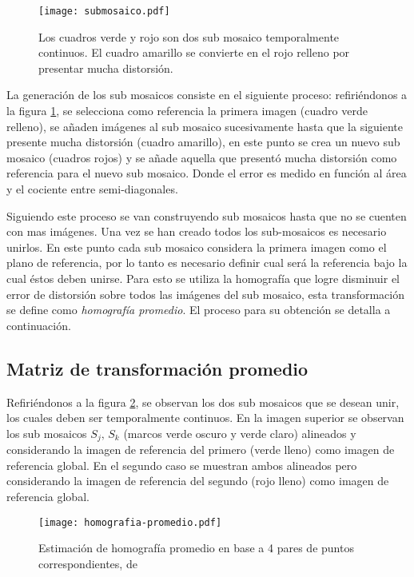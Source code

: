 \begin{figure}[h]
	\centering
	\texttt{[image: submosaico.pdf]}
	\caption[Generación de sub mosaicos]{Los cuadros verde y rojo son dos sub mosaico temporalmente continuos. El cuadro amarillo se convierte en el rojo relleno por presentar mucha distorsión.}
	\label{imagen:generacion-submosaico}
\end{figure}

La generación de los sub mosaicos consiste en el siguiente proceso: refiriéndonos a la figura \ref{imagen:generacion-submosaico}, se selecciona como referencia la primera imagen (cuadro verde relleno), se añaden imágenes al sub mosaico sucesivamente hasta que la siguiente presente mucha distorsión (cuadro amarillo), en este punto se crea un nuevo sub mosaico (cuadros rojos) y se añade aquella que presentó mucha distorsión como referencia para el nuevo sub mosaico. Donde el error es medido en función al área y el cociente entre semi-diagonales.

Siguiendo este proceso se van construyendo sub mosaicos hasta que no se cuenten con mas imágenes. Una vez se han creado todos los sub-mosaicos es necesario unirlos. En este punto cada sub mosaico considera la primera imagen como el plano de referencia, por lo tanto es necesario definir cual será la referencia bajo la cual éstos deben unirse. Para esto se utiliza la homografía que logre disminuir el error de distorsión sobre todos las imágenes del sub mosaico, esta transformación se define como \textit{homografía promedio}. El proceso para su obtención se detalla a continuación.



\subsection{Matriz de transformación promedio}\label{seccion-hpromedio}

Refiriéndonos a la figura \ref{imagen:homografia-promedio}, se observan los dos sub mosaicos que se desean unir, los cuales deben ser temporalmente continuos. En la imagen superior se observan los sub mosaicos $S_j,\,S_k$ (marcos verde oscuro y verde claro) alineados y considerando la imagen de referencia del primero (verde lleno) como imagen de referencia global. En el segundo caso se muestran ambos alineados pero considerando la imagen de referencia del segundo (rojo lleno) como imagen de referencia global. 
\begin{figure}[h]
	\centering
	\texttt{[image: homografia-promedio.pdf]}
	\caption[Estimación de homografia promedio]{Estimación de homografía promedio en base a 4 pares de puntos correspondientes, de \cite{bellavia-ref}}
	\label{imagen:homografia-promedio}
\end{figure}

